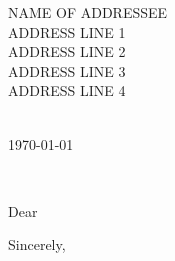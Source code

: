 \documentclass[11pt,a4paper]{letter} %
\def\opening#1{\thispagestyle{empty}
{\centering\fromaddress \vspace{0.519in} \\ %
\hspace*{\longindentation}\today\hspace*{\fill}\par} %
{\raggedright \toname \\ \toaddress \par} %
\vspace{0.4in} %
\noindent #1 %
}
\begin{document}

\begin{letter}
{NAME OF ADDRESSEE\\
ADDRESS LINE 1\\
ADDRESS LINE 2\\
ADDRESS LINE 3\\
ADDRESS LINE 4\\
}

%


\opening{Dear }

\lipsum


\closing{Sincerely,\\[2mm]
}


\end{letter}
\end{document}
